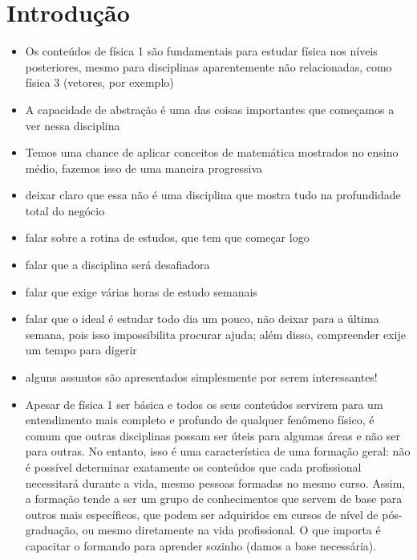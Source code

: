 \chapter*{Introdução}

\begin{itemize}
\item Os conteúdos de física 1 são fundamentais para estudar física nos níveis posteriores, mesmo para disciplinas aparentemente não relacionadas, como física 3 (vetores, por exemplo)

\item A capacidade de abstração é uma das coisas importantes que começamos a ver nessa disciplina

\item Temos uma chance de aplicar conceitos de matemática mostrados no ensino médio, fazemos isso de uma maneira progressiva

\item deixar claro que essa não é uma disciplina que mostra tudo na profundidade total do negócio

\item falar sobre a rotina de estudos, que tem que começar logo

\item falar que a disciplina será desafiadora

\item falar que exige várias horas de estudo semanais

\item falar que o ideal é estudar todo dia um pouco, não deixar para a última semana, pois isso impossibilita procurar ajuda; além disso, compreender exije um tempo para digerir

\item alguns assuntos são apresentados simplesmente por serem interessantes!

\item Apesar de física 1 ser básica e todos os seus conteúdos servirem para um entendimento mais completo e profundo de qualquer fenômeno físico, é comum que outras disciplinas possam ser úteis para algumas áreas e não ser para outras. No entanto, isso é uma característica de uma formação geral: não é possível determinar exatamente os conteúdos que cada profissional necessitará durante a vida, mesmo pessoas formadas no mesmo curso. Assim, a formação tende a ser um grupo de conhecimentos que servem de base para outros mais específicos, que podem ser adquiridos em cursos de nível de pós-graduação, ou mesmo diretamente na vida profissional. O que importa é capacitar o formando para aprender sozinho (damos a base necessária).


\end{itemize}
